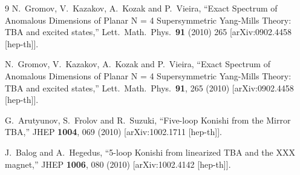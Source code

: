 \documentclass[a4paper]{article}
\numberwithin{equation}{section}
\begin{document}
\begin{thebibliography} {9}
  N.~Gromov, V.~Kazakov, A.~Kozak and P.~Vieira,
  ``Exact Spectrum of Anomalous Dimensions of Planar N = 4 Supersymmetric Yang-Mills Theory: TBA and excited states,''
  Lett.\ Math.\ Phys.\  {\bf 91} (2010) 265
  [arXiv:0902.4458 [hep-th]].
  
  N.~Gromov, V.~Kazakov, A.~Kozak and P.~Vieira,
  ``Exact Spectrum of Anomalous Dimensions of Planar N = 4 Supersymmetric Yang-Mills Theory: TBA and excited states,''
  Lett.\ Math.\ Phys.\  {\bf 91}, 265 (2010)
  [arXiv:0902.4458 [hep-th]].
  
  G.~Arutyunov, S.~Frolov and R.~Suzuki,
  ``Five-loop Konishi from the Mirror TBA,''
  JHEP {\bf 1004}, 069 (2010)
  [arXiv:1002.1711 [hep-th]].
  
  J.~Balog and A.~Hegedus,
  ``5-loop Konishi from linearized TBA and the XXX magnet,''
  JHEP {\bf 1006}, 080 (2010)
  [arXiv:1002.4142 [hep-th]].
  
\end{thebibliography}
  
\end{document}
